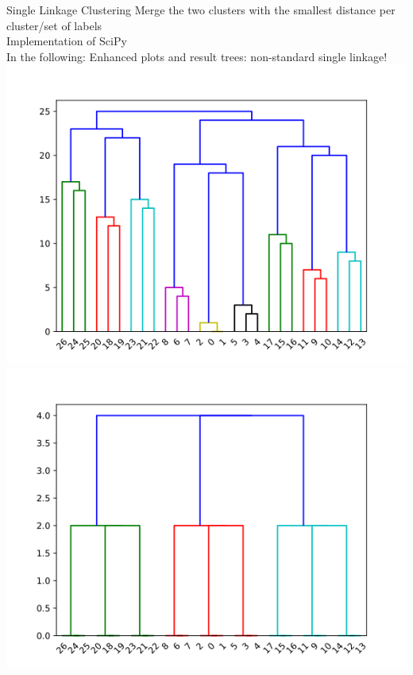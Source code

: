 \documentclass[rgb]{beamer}
\begin{document}
    \begin{frame}{Single Linkage Clustering}
        Merge the two clusters with the smallest distance per cluster/set of labels \\
        Implementation of SciPy \cite{scipy} \\
        In the following: Enhanced plots and result trees: \alert{non-standard single linkage!} \\
        \centering\includegraphics[keepaspectratio,width=\textwidth, height=0.7\textheight]{graphics/aproaches/single_noise_False_equi_dendro.png} \hspace{2cm}
        \includegraphics[keepaspectratio,width=\textwidth, height=0.7\textheight]{graphics/aproaches/single_noise_False_dendro.png}
        \end{frame}
        
\end{document}

